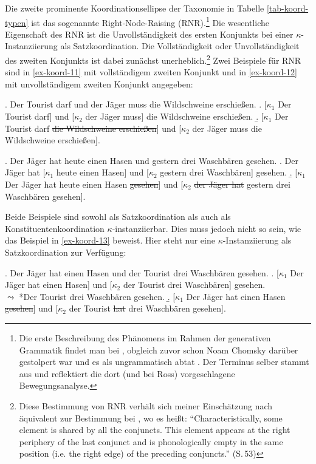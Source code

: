 Die zweite prominente Koordinationsellipse der Taxonomie in Tabelle \ref{tab-koord-typen} ist das sogenannte Right-Node-Raising (RNR).\footnote{Die erste Beschreibung des Phänomens im Rahmen der generativen Grammatik findet man bei \citet[174ff]{Ross:67}, obgleich zuvor schon Noam Chomsky darüber gestolpert war und es als ungrammatisch abtat \citep[35, Fußnote 2]{Chomsky:57}. Der Terminus selber stammt aus \cite{Postal:74} und reflektiert die dort (und bei Ross) vorgeschlagene Bewegungsanalyse.} Die wesentliche Eigenschaft des RNR ist die Unvollständigkeit des ersten Konjunkts bei einer $\kappa$-Instanziierung als Satzkoordination. Die Vollständigkeit oder Unvollständigkeit des zweiten Konjunkts ist dabei zunächst unerheblich.\footnote{Diese Bestimmung von RNR verhält sich meiner Einschätzung nach äquivalent zur Bestimmung bei \cite{Hartmann:00}, wo es hei\ss t: "`Characteristically, some element is shared by all the conjuncts. This element appears at the right periphery of the last conjunct and is phonologically empty in the same position (i.e. the right edge) of the preceding conjuncts."' (S.\,53)} Zwei Beispiele für RNR sind in \ref{ex-koord-11} mit vollständigem zweiten Konjunkt und in \ref{ex-koord-12} mit unvollständigem zweiten Konjunkt angegeben: 

\exi. \label{ex-koord-11} Der Tourist darf und der J\"ager muss die Wildschweine erschie\ss en.
\a. [$\kappa_1$ Der Tourist darf] und [$\kappa_2$ der J\"ager muss] die Wildschweine erschie\ss en.
\b. [$\kappa_1$ Der Tourist darf \sout{die Wildschweine erschie\ss en}] und [$\kappa_2$ der J\"ager muss die Wildschweine erschie\ss en].

\exi. \label{ex-koord-12} Der J\"ager hat heute einen Hasen und gestern drei Waschb\"aren gesehen.
\a. Der J\"ager hat [$\kappa_1$ heute einen Hasen] und [$\kappa_2$ gestern drei Waschb\"aren] gesehen.
\b. [$\kappa_1$ Der J\"ager hat heute einen Hasen \sout{gesehen}] und [$\kappa_2$ \sout{der Jäger hat}  gestern drei Waschb\"aren gesehen].

Beide Beispiele sind sowohl als Satzkoordination als auch als Konstituentenkoordination $\kappa$-instanziierbar. Dies muss jedoch nicht so sein, wie das Beispiel in \ref{ex-koord-13} beweist. Hier steht nur eine $\kappa$-Instanziierung als Satzkoordination zur Verfügung: 

\ex. \label{ex-koord-13}Der Jäger hat einen Hasen und der Tourist drei Waschbären gesehen.
\a. [$\kappa_1$ Der Jäger hat einen Hasen] und [$\kappa_2$ der Tourist drei Waschbären] gesehen. \\
$\leadsto$ *Der Tourist drei Waschbären gesehen.
\b. [$\kappa_1$ Der Jäger hat einen Hasen \sout{gesehen}] und [$\kappa_2$ der Tourist \sout{hat} drei Waschbären gesehen].


